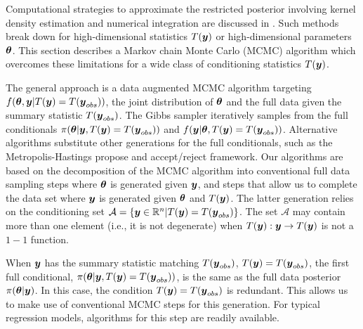 \documentclass[11pt]{article}
\def\bth{\mbox{\boldmath $\theta$}}
\def\bbeta{\mbox{\boldmath $\beta$}}
\newcommand{\by}{\mbox{\boldmath $y$}}
\begin{document}
Computational strategies to approximate the restricted posterior involving kernel density estimation and numerical integration are discussed in \cite{}. Such methods break down for high-dimensional statistics $T(\by)$ or high-dimensional parameters $\bth$. This section describes a Markov chain Monte Carlo (MCMC) algorithm which overcomes these limitations for a wide class of conditioning statistics  $T(\by)$. 

The general approach is a data augmented
MCMC algorithm targeting $f(\bth, \by |
T(\by)=T(\by_{obs}))$, the joint distribution of $\bth$ and the full
data given the summary statistic $T(\by_{obs})$. 
The Gibbs sampler \citep{geman1984} iteratively samples from the full conditionals $\pi(\bth|\by, T(\by)=T(\by_{obs}))$ and $f(\by|\bth, T(\by)=T(\by_{obs}))$.  Alternative algorithms substitute other generations for the full conditionals, such as the Metropolis-Hastings propose and accept/reject framework.  Our algorithms are based on the decomposition of the MCMC algorithm into conventional full data sampling steps where $\bth$ is generated given $\by$, and steps that allow us to complete the data set where $\by$ is generated given $\bth$ and $T(\by)$.  The latter generation relies on the conditioning set $\mathcal{A}=\{\by\in \mathbb{R}^n|T(\by)=T(\by_{obs})\}$.  The set $\mathcal{A}$ may contain more than one element (i.e., it is not degenerate) when $T(\by) : \by \rightarrow T(\by)$ is not a $1-1$ function.
 
When $\by$ has the summary statistic matching $T(\by_{obs})$, $T(\by) = T(\by_{obs})$,
the first full conditional, $\pi(\bth|\by, T(\by)=T(\by_{obs}))$, is
the same as the full data posterior
$\pi(\bth|\by)$. In this case, the condition $T(\by) = T(\by_{obs})$ is redundant.  This allows us to make use of conventional MCMC steps for this generation.  For typical regression models, algorithms for this step are readily available.  %
\end{document}
